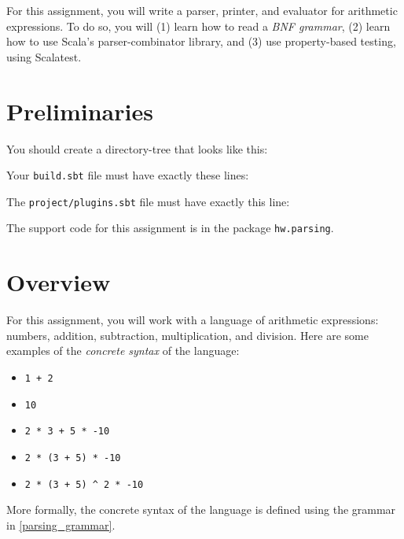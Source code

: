 
For this assignment, you will write a parser, printer, and evaluator for arithmetic expressions.  To do so, you will (1) learn how to read a \emph{BNF grammar}, (2) learn how to use Scala's parser-combinator library, and (3) use property-based testing, using Scalatest.

\section{Preliminaries}

You should create a directory-tree that looks like this:


Your \texttt{build.sbt} file must have exactly these lines:


The \texttt{project/plugins.sbt} file must have exactly this line:


The support code for this assignment is in the package \texttt{hw.parsing}.

\section{Overview}

For this assignment, you will work with a language of arithmetic expressions: numbers, addition, subtraction, multiplication, and division. Here are some examples of the \emph{concrete syntax} of the language:

\begin{itemize}
  \item \texttt{1 + 2}
  \item \texttt{10}
  \item \texttt{2 * 3 + 5 * -10}
  \item \texttt{2 * (3 + 5) * -10}
  \item \verb|2 * (3 + 5) ^ 2 * -10|
\end{itemize}

More formally, the concrete syntax of the language is defined using the grammar in \cref{parsing_grammar}.

